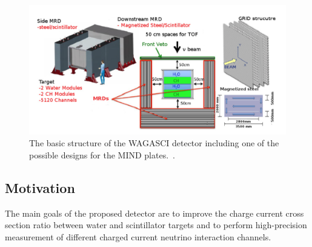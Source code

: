 \begin{figure}[h!]
\centering
\includegraphics[width=\textwidth]{figures/WAGASCI.png}
\caption{The basic structure of the WAGASCI detector including one of the possible designs for the MIND plates.~\cite{30WAGASCI}.}
\label{fig:WAGASCI}
\end{figure}

\subsection{Motivation}
The main goals of the proposed detector are to improve the charge current cross section ratio between water and scintillator targets and to perform high-precision measurement of different charged current neutrino interaction channels.

